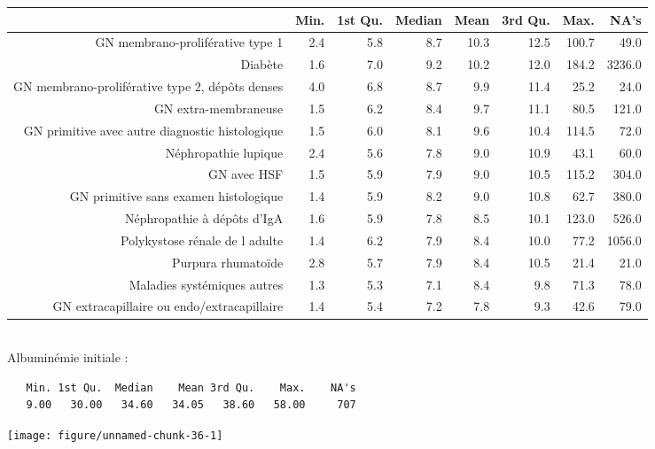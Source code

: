\documentclass[11pt,a4paper]{article}\usepackage[]{graphicx}\usepackage[]{color}
\makeatletter
\def\maxwidth{ %
  \ifdim\Gin@nat@width>\linewidth
    \linewidth
  \else
    \Gin@nat@width
  \fi
}
\newenvironment{kframe}{%
 \def\at@end@of@kframe{}%
 \ifinner\ifhmode%
  \def\at@end@of@kframe{\end{minipage}}%
  \begin{minipage}{\columnwidth}%
 \fi\fi%
 \def\FrameCommand##1{\hskip\@totalleftmargin \hskip-\fboxsep
 \colorbox{shadecolor}{##1}\hskip-\fboxsep
     \hskip-\linewidth \hskip-\@totalleftmargin \hskip\columnwidth}%
 \MakeFramed {\advance\hsize-\width
   \@totalleftmargin\z@ \linewidth\hsize
   \@setminipage}}%
 {\par\unskip\endMakeFramed%
 \at@end@of@kframe}
\newenvironment{knitrout}{}{} %
\makeatother
\begin{document}
\begin{table}[H]
\centering
\begingroup\small
\begin{tabular}{rrrrrrrr}
  \hline
 & Min. & 1st Qu. & Median & Mean & 3rd Qu. & Max. & NA's \\ 
  \hline
GN membrano-proliférative type 1 & 2.4 & 5.8 & 8.7 & 10.3 & 12.5 & 100.7 & 49.0 \\ 
  Diabète & 1.6 & 7.0 & 9.2 & 10.2 & 12.0 & 184.2 & 3236.0 \\ 
  GN membrano-proliférative type 2, dépôts denses & 4.0 & 6.8 & 8.7 & 9.9 & 11.4 & 25.2 & 24.0 \\ 
  GN extra-membraneuse & 1.5 & 6.2 & 8.4 & 9.7 & 11.1 & 80.5 & 121.0 \\ 
  GN primitive avec autre diagnostic histologique & 1.5 & 6.0 & 8.1 & 9.6 & 10.4 & 114.5 & 72.0 \\ 
  Néphropathie lupique & 2.4 & 5.6 & 7.8 & 9.0 & 10.9 & 43.1 & 60.0 \\ 
  GN avec HSF & 1.5 & 5.9 & 7.9 & 9.0 & 10.5 & 115.2 & 304.0 \\ 
  GN primitive sans examen histologique & 1.4 & 5.9 & 8.2 & 9.0 & 10.8 & 62.7 & 380.0 \\ 
  Néphropathie à dépôts d'IgA & 1.6 & 5.9 & 7.8 & 8.5 & 10.1 & 123.0 & 526.0 \\ 
  Polykystose rénale de l adulte & 1.4 & 6.2 & 7.9 & 8.4 & 10.0 & 77.2 & 1056.0 \\ 
  Purpura rhumatoïde & 2.8 & 5.7 & 7.9 & 8.4 & 10.5 & 21.4 & 21.0 \\ 
  Maladies systémiques autres & 1.3 & 5.3 & 7.1 & 8.4 & 9.8 & 71.3 & 78.0 \\ 
  GN extracapillaire ou endo/extracapillaire & 1.4 & 5.4 & 7.2 & 7.8 & 9.3 & 42.6 & 79.0 \\ 
   \hline
\end{tabular}
\endgroup
\end{table}


~\\

Albuminémie initiale :


\begin{knitrout}
\color{fgcolor}\begin{kframe}
\begin{verbatim}
   Min. 1st Qu.  Median    Mean 3rd Qu.    Max.    NA's 
   9.00   30.00   34.60   34.05   38.60   58.00     707 
\end{verbatim}
\end{kframe}
\texttt{[image: figure/unnamed-chunk-36-1]} 

\end{knitrout}
\end{document}
